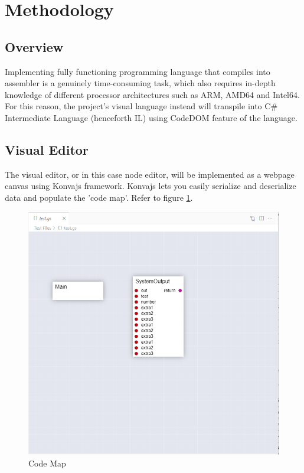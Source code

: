 \documentclass{report}
\begin{document}
\section{Methodology}
\subsection*{Overview}
Implementing fully functioning programming language that compiles into assembler is a genuinely time-consuming task, which also requires in-depth knowledge of different processor architectures such as ARM, AMD64 and Intel64. For this reason, the project's visual language instead will transpile into C\# Intermediate Language (henceforth IL) using CodeDOM feature of the language.
\subsection*{Visual Editor}
The visual editor, or in this case node editor, will be implemented as a webpage canvas using Konvajs framework.
Konvajs lets you easily serialize and deserialize data and populate the 'code map'. Refer to figure \ref{fig:codemap}.
\begin{figure}[H]
    \centering
    \includegraphics[width=1\textwidth]{codemap.PNG}
    \caption{Code Map}
    \label{fig:codemap}
\end{figure}
\end{document}
